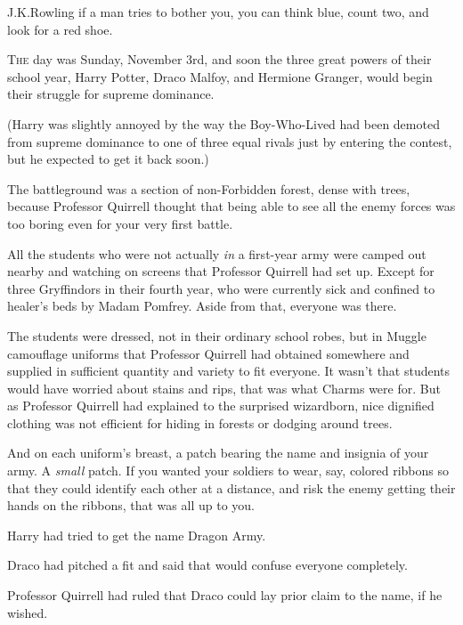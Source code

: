 
\begin{chapterOpeningAuthorNote}
J.\?K.\?Rowling if a man tries to bother you, you can think blue, count two, and look for a red shoe.
\end{chapterOpeningAuthorNote}

\lettrine{T}{he} day was Sunday, November 3rd, and soon the three great powers of their school year, Harry Potter, Draco Malfoy, and Hermione Granger, would begin their struggle for supreme dominance.

(Harry was slightly annoyed by the way the Boy-Who-Lived had been demoted from supreme dominance to one of three equal rivals just by entering the contest, but he expected to get it back soon.)

The battleground was a section of non-Forbidden forest, dense with trees, because Professor Quirrell thought that being able to see all the enemy forces was too boring even for your very first battle.

All the students who were not actually \emph{in} a first-year army were camped out nearby and watching on screens that Professor Quirrell had set up. Except for three Gryffindors in their fourth year, who were currently sick and confined to healer's beds by Madam Pomfrey. Aside from that, everyone was there.

The students were dressed, not in their ordinary school robes, but in Muggle camouflage uniforms that Professor Quirrell had obtained somewhere and supplied in sufficient quantity and variety to fit everyone. It wasn't that students would have worried about stains and rips, that was what Charms were for. But as Professor Quirrell had explained to the surprised wizardborn, nice dignified clothing was not efficient for hiding in forests or dodging around trees.

And on each uniform's breast, a patch bearing the name and insignia of your army. A \emph{small} patch. If you wanted your soldiers to wear, say, colored ribbons so that they could identify each other at a distance, and risk the enemy getting their hands on the ribbons, that was all up to you.

Harry had tried to get the name Dragon Army.

Draco had pitched a fit and said that would confuse everyone completely.

Professor Quirrell had ruled that Draco could lay prior claim to the name, if he wished.

